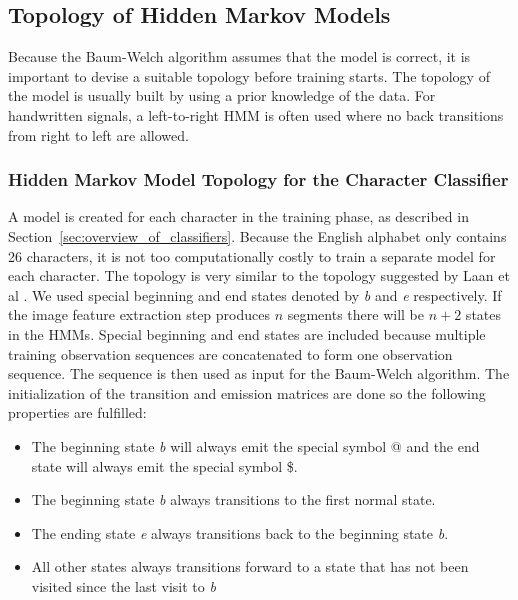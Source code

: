 
\subsection{Topology of Hidden Markov Models}

Because the Baum-Welch algorithm assumes that the model is correct, it is important to devise a suitable topology before training starts. 
The topology of the model is usually built by using a prior knowledge of the data. 
For handwritten signals, a left-to-right HMM is often used where no back transitions from right to left are allowed. \cite{Suen}

\subsubsection{Hidden Markov Model Topology for the Character Classifier}

A model is created for each character in the training phase, as described in Section~\ref{sec:overview_of_classifiers}.
Because the English alphabet only contains 26 characters, it is not too computationally costly to train a separate model for each character.
The topology is very similar to the topology suggested by Laan et al \cite{Laan}. 
We used special beginning and end states denoted by \textit{b} and \textit{e} respectively.
If the image feature extraction step produces $n$ segments there will be $n + 2$ states in the HMMs.
Special beginning and end states are included because multiple training observation sequences are concatenated to form one observation sequence.
The sequence is then used as input for the Baum-Welch algorithm.
The initialization of the transition and emission matrices are done so the following properties are fulfilled:

\begin{itemize}
 \item The beginning state \textit{b} will always emit the special symbol @ and the end state will always emit the special symbol \$.
 \item The  beginning state \textit{b} always transitions to the first normal state.
 \item The ending state \textit{e} always transitions back to the beginning state \textit{b}.
 \item All other states always transitions forward to a state that has not been visited since the last visit to \textit{b}
\end{itemize}



